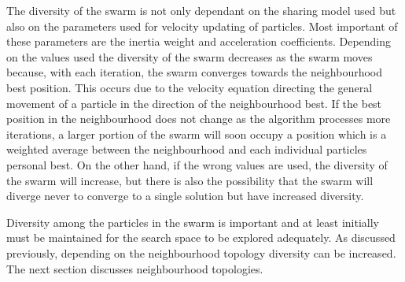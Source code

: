 The diversity of the swarm is not only dependant on the sharing model used but also on the parameters used for velocity updating of particles. Most important of these parameters are the inertia weight and acceleration coefficients. Depending on the values used the diversity of the swarm decreases as the swarm moves because, with each iteration, the swarm converges towards the neighbourhood best position\cite{PSOHybridJobShop,CompuIntelligenceIntro,FundamentalSwarm}. This occurs due to the velocity equation directing the general movement of a particle in the direction of the neighbourhood best\cite{PSOHybridJobShop,CompuIntelligenceIntro,FundamentalSwarm}. If the best position in the neighbourhood does not change as the algorithm processes more iterations, a larger portion of the swarm will soon occupy a position which is a weighted average between the neighbourhood and each individual particles personal best\cite{PSOHybridJobShop,CompuIntelligenceIntro,FundamentalSwarm}. On the other hand, if the wrong values are used, the diversity of the swarm will increase, but there is also the possibility that the swarm will diverge never to converge to a single solution but have increased diversity\cite{FundamentalSwarm}.

Diversity among the particles in the swarm is important and at least initially must be maintained for the search space to be explored adequately. As discussed previously, depending on the neighbourhood topology diversity can be increased. The next section discusses neighbourhood topologies.
